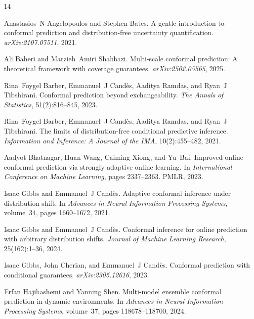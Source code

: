 \documentclass{article}
\theoremstyle{definition}
\begin{document}
\begin{small}
\begin{thebibliography}{14}

Anastasios~N Angelopoulos and Stephen Bates.
\newblock A gentle introduction to conformal prediction and distribution-free uncertainty quantification.
\newblock \emph{arXiv:2107.07511}, 2021.

Ali Baheri and Marzieh~Amiri Shahbazi.
\newblock Multi-scale conformal prediction: A theoretical framework with coverage guarantees.
\newblock \emph{arXiv:2502.05565}, 2025.

Rina~Foygel Barber, Emmanuel~J Cand{\`e}s, Aaditya Ramdas, and Ryan~J Tibshirani.
\newblock Conformal prediction beyond exchangeability.
\newblock \emph{The Annals of Statistics}, 51(2):816--845, 2023.

Rina~Foygel Barber, Emmanuel~J Cand{\`e}s, Aaditya Ramdas, and Ryan~J Tibshirani.
\newblock The limits of distribution-free conditional predictive inference.
\newblock \emph{Information and Inference: A Journal of the IMA}, 10(2):455--482, 2021.

Aadyot Bhatnagar, Huan Wang, Caiming Xiong, and Yu~Bai.
\newblock Improved online conformal prediction via strongly adaptive online learning.
\newblock In \emph{International Conference on Machine Learning}, pages 2337--2363. PMLR, 2023.

Isaac Gibbs and Emmanuel~J Cand{\`e}s.
\newblock Adaptive conformal inference under distribution shift.
\newblock In \emph{Advances in Neural Information Processing Systems}, volume~34, pages 1660--1672, 2021.

Isaac Gibbs and Emmanuel~J Cand{\`e}s.
\newblock Conformal inference for online prediction with arbitrary distribution shifts.
\newblock \emph{Journal of Machine Learning Research}, 25(162):1--36, 2024.

Isaac Gibbs, John Cherian, and Emmanuel~J Cand{\`e}s.
\newblock Conformal prediction with conditional guarantees.
\newblock \emph{arXiv:2305.12616}, 2023.

Erfan Hajihashemi and Yanning Shen.
\newblock Multi-model ensemble conformal prediction in dynamic environments.
\newblock In \emph{Advances in Neural Information Processing Systems}, volume~37, pages 118678--118700, 2024.


\end{thebibliography}
\end{small}
\end{document}
